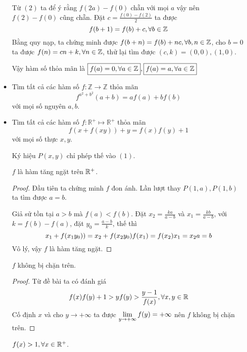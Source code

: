 \documentclass[11pt]{scrartcl}
\begin{document}
\begin{itemize}[label=, leftmargin=0em, itemsep=0.5em]
\begin{sol}
        Từ $(2)$ ta để ý rằng $f(2a) - f(0)$ chẵn với mọi $a$ vậy nên $ f(2) - f(0)$ cũng chẵn. Đặt $c = \frac{f(0) - f(2)}{2}$ ta được
        \[
            f(b + 1) = f(b) + c, \forall b \in \mathbb{Z}
        \]
        Bằng quy nạp, ta chứng minh được $f(b + n) = f(b) + nc, \forall b,n \in \mathbb{Z}$, cho $b = 0$ ta được $f(n)= cn + k ,\forall n \in \mathbb{Z}$, thử lại tìm được $(c,k) = (0,0), (1,0)$.

        Vậy hàm số thỏa mãn là $\boxed{f(a) = 0, \forall a \in \mathbb{Z}}, \boxed{f(a) = a, \forall a \in \mathbb{Z}}$
    \end{sol}
    \item \begin{btvn}
        Tìm tất cả các hàm số $f: \mathbb{Z} \to \mathbb{Z}$ thỏa mãn
        \[f^{a^{2} + b^{2}}(a+b) = af(a) +bf(b)\]
        với mọi số nguyên $a,b$.
    \end{btvn}

    \item \begin{bt}
        Tìm tất cả các hàm số $f : \mathbb{R^+} \mapsto \mathbb{R^+}$ thỏa mãn
        \[f(x+f(xy))+y=f(x)f(y)+1\]
        với mọi số thực $x,y$.
    \end{bt}
    \begin{sol}
        Ký hiệu $P(x,y)$ chỉ phép thế vào $(1)$.

         $f$ là hàm tăng ngặt trên $\mathbb{R^+}$. 
        \begin{proof}
            Đầu tiên ta chứng minh $f$ đon ánh. Lần lượt thay $P(1,a), P(1,b)$ ta tìm được $a = b$.

            Giả sử tồn tại $a > b$ mà $f(a) < f(b)$. Đặt $x_2=\frac{ka}{a-b}$ và $x_1=\frac{kb}{a-b}$, với $k=f(b)-f(a)$, đặt $y_0=\frac{a-b}{k}$, thế thì
                $$x_1+f(x_1y_0))=x_2+f(x_2y_0) \ra f(x_1) = f(x_2) \ra x_1 = x_2 \ra a = b$$
            Vô lý, vậy $f$ là hàm tăng ngặt.
        \end{proof}
         $f$ không bị chặn trên.
        \begin{proof}
            Từ đề bài ta có đánh giá 
        \[
            f(x)f(y) + 1 > y \lra f(y) > \frac{y - 1}{f(x)}, \xyr
        \]
        Cố định $x$ và cho $y \to +\infty$ ta được $\displaystyle\lim_{y \to +\infty}f(y) = +\infty$ nên $f$ không bị chặn trên.
        \end{proof}
         $f(x) > 1,\forall x\in \mathbb{R^+}$.
        


\end{sol}
\end{itemize}
\end{document}
